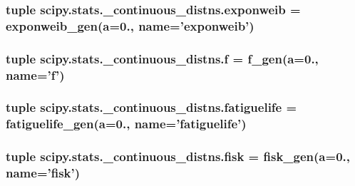 \subsubsection[{exponweib}]{\setlength{\rightskip}{0pt plus 5cm}tuple scipy.\+stats.\+\_\+continuous\+\_\+distns.\+exponweib = {\bf exponweib\+\_\+gen}({\bf a}=0., name='exponweib')}\label{namespacescipy_1_1stats_1_1__continuous__distns_a84cb575f77517e5051caf64bddc3e4e9}
\hypertarget{namespacescipy_1_1stats_1_1__continuous__distns_a7086618cccd2611410b71cea555d9f51}{}
\subsubsection[{f}]{\setlength{\rightskip}{0pt plus 5cm}tuple scipy.\+stats.\+\_\+continuous\+\_\+distns.\+f = {\bf f\+\_\+gen}({\bf a}=0., name='f')}\label{namespacescipy_1_1stats_1_1__continuous__distns_a7086618cccd2611410b71cea555d9f51}
\hypertarget{namespacescipy_1_1stats_1_1__continuous__distns_ab9a9e9b91c7b33b3fcf3d6aa9c075397}{}
\subsubsection[{fatiguelife}]{\setlength{\rightskip}{0pt plus 5cm}tuple scipy.\+stats.\+\_\+continuous\+\_\+distns.\+fatiguelife = {\bf fatiguelife\+\_\+gen}({\bf a}=0., name='fatiguelife')}\label{namespacescipy_1_1stats_1_1__continuous__distns_ab9a9e9b91c7b33b3fcf3d6aa9c075397}
\hypertarget{namespacescipy_1_1stats_1_1__continuous__distns_afe490df99b722cf649f6f0b0615421b1}{}
\subsubsection[{fisk}]{\setlength{\rightskip}{0pt plus 5cm}tuple scipy.\+stats.\+\_\+continuous\+\_\+distns.\+fisk = {\bf fisk\+\_\+gen}({\bf a}=0., name='fisk')}\label{namespacescipy_1_1stats_1_1__continuous__distns_afe490df99b722cf649f6f0b0615421b1}
\hypertarget{namespacescipy_1_1stats_1_1__continuous__distns_ab9bcea9d10c769d84c56a21c86b583ff}{}
